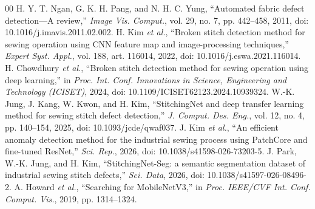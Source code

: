 \documentclass[conference,a4paper]{IEEEtran}
\begin{document}
\begin{thebibliography}{00}
 H. Y. T. Ngan, G. K. H. Pang, and N. H. C. Yung, ``Automated fabric defect detection---A review,'' \emph{Image Vis. Comput.}, vol. 29, no. 7, pp. 442--458, 2011, doi: 10.1016/j.imavis.2011.02.002.
 H. Kim \emph{et al.}, ``Broken stitch detection method for sewing operation using CNN feature map and image-processing techniques,'' \emph{Expert Syst. Appl.}, vol. 188, art. 116014, 2022, doi: 10.1016/j.eswa.2021.116014.
 H. Chowdhury \emph{et al.}, ``Broken stitch detection method for sewing operation using deep learning,'' in \emph{Proc. Int. Conf. Innovations in Science, Engineering and Technology (ICISET)}, 2024, doi: 10.1109/ICISET62123.2024.10939324.
 W.-K. Jung, J. Kang, W. Kwon, and H. Kim, ``StitchingNet and deep transfer learning method for sewing stitch defect detection,'' \emph{J. Comput. Des. Eng.}, vol. 12, no. 4, pp. 140--154, 2025, doi: 10.1093/jcde/qwaf037.
 J. Kim \emph{et al.}, ``An efficient anomaly detection method for the industrial sewing process using PatchCore and fine-tuned ResNet,'' \emph{Sci. Rep.}, 2026, doi: 10.1038/s41598-026-73203-5.
 J. Park, W.-K. Jung, and H. Kim, ``StitchingNet-Seg: a semantic segmentation dataset of industrial sewing stitch defects,'' \emph{Sci. Data}, 2026, doi: 10.1038/s41597-026-08496-2.
 A. Howard \emph{et al.}, ``Searching for MobileNetV3,'' in \emph{Proc. IEEE/CVF Int. Conf. Comput. Vis.}, 2019, pp. 1314--1324.
\end{thebibliography}
\end{document}
